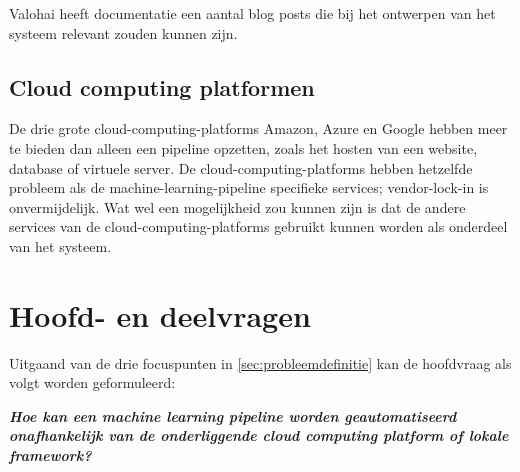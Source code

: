 Valohai heeft documentatie een aantal blog posts die bij het ontwerpen van het systeem relevant zouden kunnen zijn.

\subsection{Cloud computing platformen}\label{subsec:cloud-computing-platformen}
De drie grote \glspl{cloud-computing-platform} Amazon, Azure en Google hebben meer te bieden dan alleen een pipeline opzetten, zoals het hosten van een website, database of virtuele server. De \glspl{cloud-computing-platform} hebben hetzelfde probleem als de \gls{machine-learning-pipeline} specifieke services; \gls{vendor-lock-in} is onvermijdelijk. Wat wel een mogelijkheid zou kunnen zijn is dat de andere services van de \glspl{cloud-computing-platform} gebruikt kunnen worden als onderdeel van het systeem.


\section{Hoofd- en deelvragen}\label{sec:hoofd-en-deelvragen}
Uitgaand van de drie focuspunten in \autoref{sec:probleemdefinitie} kan de hoofdvraag als volgt worden geformuleerd:\smallskip

\begin{quoting}
  \begin{center}
    \textbf{
      \textit{
        Hoe kan een machine learning pipeline worden geautomatiseerd onafhankelijk van de onderliggende cloud computing platform of lokale framework?
      }
    }
  \end{center}
\end{quoting}\smallskip

